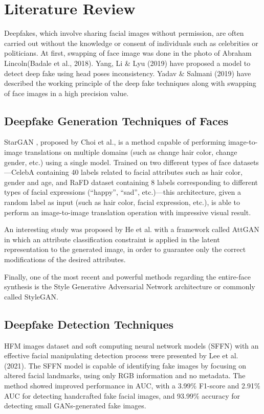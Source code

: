 \chapter{Literature Review}
Deepfakes, which involve sharing facial images without permission, are often carried out without the knowledge or consent of individuals such as celebrities or politicians. At first, swapping of face image was done in the photo of Abraham Lincoln(Badale et al., 2018)\cite{badale2018deep}. Yang, Li \& Lyu (2019)\cite{yang2019exposing} have proposed a model to detect deep fake using head poses inconsistency. Yadav \& Salmani (2019)\cite{yadav2019deepfake} have described the working principle of the deep fake techniques along with swapping of face images in a high precision value.

\section{Deepfake Generation Techniques of Faces}
StarGAN \cite{choi2018stargan}, proposed by Choi et al., is a method capable of performing image-to-image translations on multiple domains (such as change hair color, change gender,
etc.) using a single model. Trained on two different types of face datasets—CelebA \cite{7410782}
containing 40 labels related to facial attributes such as hair color, gender and age, and
RaFD dataset \cite{cho2019imagetoimage} containing 8 labels corresponding to different types of facial expressions
(“happy”, “sad”, etc.)—this architecture, given a random label as input (such as hair color, facial expression, etc.), is able to perform an image-to-image translation operation with impressive visual result. 

An interesting study was proposed by He et al. \cite{7410782} with a framework called
AttGAN in which an attribute classification constraint is applied in the latent representation to the generated image, in order to guarantee only the correct modifications of the
desired attributes. 

Finally, one of the most recent and powerful methods regarding the entire-face synthesis is the Style Generative Adversarial Network architecture or commonly called
StyleGAN. \cite{Giudice_2021}

\section{Deepfake Detection Techniques}
HFM images dataset and soft computing neural network models (SFFN) with an effective facial manipulating detection process were presented by Lee et al. (2021)\cite{lee2021detecting}. The SFFN model is capable of identifying fake images by focusing on altered facial landmarks, using only RGB information and no metadata. The method showed improved performance in AUC, with a 3.99\% F1-score and 2.91\% AUC for detecting handcrafted fake facial images, and 93.99\% accuracy for detecting small GANs-generated fake images.

